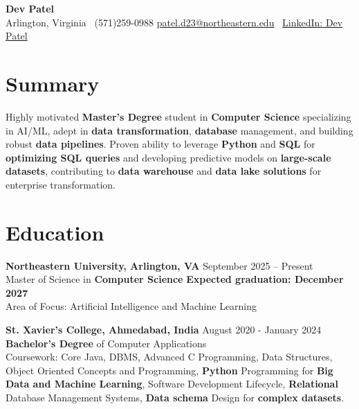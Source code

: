 \documentclass[a4paper,10pt]{article}
\begin{document}
\begin{center}
\vspace{-3mm}
    \fontsize{16}{18}\selectfont \textbf{Dev Patel} \\
    \vspace{0mm}
    \normalsize Arlington, Virginia \textbar\ (571)259-0988  \textbar       \href{mailto:patel.d23@northeastern.edu}{patel.d23@northeastern.edu} \textbar\ \href{https://www.linkedin.com/in/devxpatel//}{LinkedIn: Dev Patel} \\
\end{center}



\section*{Summary}
Highly motivated \textbf{Master's Degree} student in \textbf{Computer Science} specializing in AI/ML, adept in \textbf{data transformation}, \textbf{database} management, and building robust \textbf{data pipelines}. Proven ability to leverage \textbf{Python} and \textbf{SQL} for \textbf{optimizing SQL queries} and developing predictive models on \textbf{large-scale datasets}, contributing to \textbf{data warehouse} and \textbf{data lake solutions} for enterprise transformation.
 
\vspace{ 0 mm}
\section*{Education}
\textbf{Northeastern University, Arlington, VA} \hfill September 2025 -- Present\\
Master of Science in \textbf{Computer Science} \hfill \textbf{Expected graduation: December 2027} \\
Area of Focus: Artificial Intelligence and Machine Learning

\vspace{1 mm} %
\textbf{St. Xavier's College, Ahmedabad, India} \hfill August 2020 - January 2024 \\
\textbf{Bachelor’s Degree} of Computer Applications\\
Coursework: Core Java, DBMS, Advanced C Programming, Data Structures, Object Oriented Concepts and Programming, \textbf{Python} Programming for \textbf{Big Data and Machine Learning}, Software Development Lifecycle, \textbf{Relational} Database Management Systems, \textbf{Data schema} Design for \textbf{complex datasets}.
\end{document}
